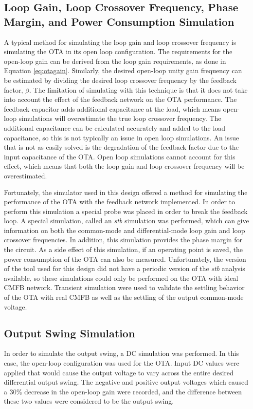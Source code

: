 \subsection{Loop Gain, Loop Crossover Frequency, Phase Margin, and Power Consumption Simulation}
\label{sec:loopsimulation}
A typical method for simulating the loop gain and loop crossover frequency is simulating the OTA in its open loop configuration. The requirements for the open-loop gain can be derived from the loop gain requirements, as done in Equation \ref{eq:otagain}. Similarly, the desired open-loop unity gain frequency can be estimated by dividing the desired loop crossover frequency by the feedback factor, $\beta$. The limitation of simulating with this technique is that it does not take into account the effect of the feedback network on the OTA performance. The feedback capacitor adds additional capacitance at the load, which means open-loop simulations will overestimate the true loop crossover frequency. The additional capacitance can be calculated accurately and added to the load capacitance, so this is not typically an issue in open loop simulations. An issue that is not as easily solved is the degradation of the feedback factor due to the input capacitance of the OTA. Open loop simulations cannot account for this effect, which means that both the loop gain and loop crossover frequency will be overestimated. 

Fortunately, the simulator used in this design offered a method for simulating the performance of the OTA with the feedback network implemented. In order to perform this simulation a special probe was placed in order to break the feedback loop. A special simulation, called an \textit{stb} simulation was performed, which can give information on both the common-mode and differential-mode loop gain and loop crossover frequencies. In addition, this simulation provides the phase margin for the circuit. As a side effect of this simulation, if an operating point is saved, the power consumption of the OTA can also be measured. Unfortunately, the version of the tool used for this design did not have a periodic version of the \textit{stb} analysis available, so these simulations could only be performed on the OTA with ideal CMFB network. Transient simulation were used to validate the settling behavior of the OTA with real CMFB as well as the settling of the output common-mode voltage.
\subsection{Output Swing Simulation}
In order to simulate the output swing, a DC simulation was performed. In this case, the open-loop configuration was used for the OTA. Input DC values were applied that would cause the output voltage to vary across the entire desired differential output swing. The negative and positive output voltages which caused a 30\% decrease in the open-loop gain were recorded, and the difference between these two values were considered to be the output swing.
